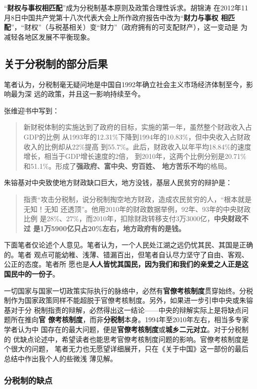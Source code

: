“\textbf{财权与事权相匹配}”成为分税制基本原则及政策合理性诉求。胡锦涛
在2012年11月8日中国共产党第十八次代表大会上所作政府报告中改为“\textbf{财力与事权
  相匹配}”，“财权”（与税基相关）变“财力”（政府拥有的可支配财产），这一变动是
为减轻各地区发展不平衡现象。


\subsection{关于分税制的部分后果}

笔者认为，分税制毫无疑问地是中国自1992年确立社会主义市场经济体制至今，影响最为深
远的政策，并且这一影响持续至今。

张维迎书中写到：
\begin{quotation}
  新财税体制的实施达到了政府的目标，实施的第一年，虽然整个财政收入占GDP的比例
  从1993年的12.31\%下降到1994年的10.83\%，但中央收入占财政收入的比例却从22\%提高
  到55.7\%。此后，财政收入以年平均18.84\%的速度增长，相当于GDP增长速度的2倍，
  到2010年，这两个比例分别是20.71\%和51.1\%。形成了\textbf{强政府、富中央、穷百姓、
    地方苦乐不均}的格局。
\end{quotation}

朱镕基对中央致使地方财政缺口巨大，地方没钱，基层人民贫穷的辩护是：
\begin{quotation}
  指责“攻击分税制，说分税制掏空地方财政，造成农民贫穷的人，“根本就是无知！无知
  还透顶”。他用2010年的财政数据举例，92年、93年的中央财政比例
  是28\%、27\%，而2010年，扣除财政转移支付3万3000亿，\textbf{中央财政不过
    是1万5900亿只占20\%左右，地方政府有的是钱。}
\end{quotation}

下面笔者仅论述个人意见。笔者认为，一个人民处江湖之远仍忧其民、其国是正确的。笔者
观点可能幼稚、浅薄、错漏百出，但笔者自认尽力坚守了自由、客观、公正的态度。笔者所
愿也是\textbf{人人皆忧其国民，因为我们和我们的亲爱之人正是这国民中的一份子}。

一切国家与国家一切政策实际执行的脉络中，必然有\textbf{官僚考核制度}贯穿始终。分税
制作为国家政策同样不能超脱于官僚考核制度。另外，如果进一步引申中央或朱镕基对于分
税制指责的辩解，必然得出这一结论——中央的辩解实际上是将缺点问题所在推向\textbf{官
  僚考核制度}，而非\textbf{分税制}本身。1994年至2010年左右，相当多专家学者认为中
国存在的最大问题，便是\textbf{官僚考核制度}或\textbf{城乡二元对立}。对于分税制的
优缺点论述中，希望读者也能思考官僚考核制度问题的影响。官僚考核制度是个很大的问题，
笔者无力也无愿望详细展开，只在《关于中国》这一部份的最后总结中作出我个人的些微浅
薄见解。

\subsubsection{分税制的缺点}

